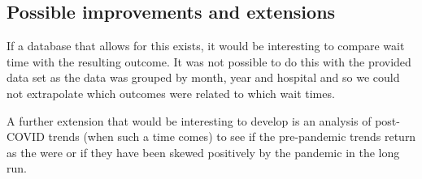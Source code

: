 \documentclass[12pt,a4paper]{article}
\begin{document}
\subsection{Possible improvements and extensions} 

If a database that allows for this exists, it would be interesting to compare wait time with the resulting outcome. It was not possible to do this with the provided data set as the data was grouped by month, year and hospital and so we could not extrapolate which outcomes were related to which wait times.

A further extension that would be interesting to develop is an analysis of post-COVID trends (when such a time comes) to see if the pre-pandemic trends return as the were or if they have been skewed positively by the pandemic in the long run.

\newpage
{}

\thispagestyle{empty}
\def\UrlBreaks{\do\/\do-}
\footnotesize{
    
}
\end{document}
